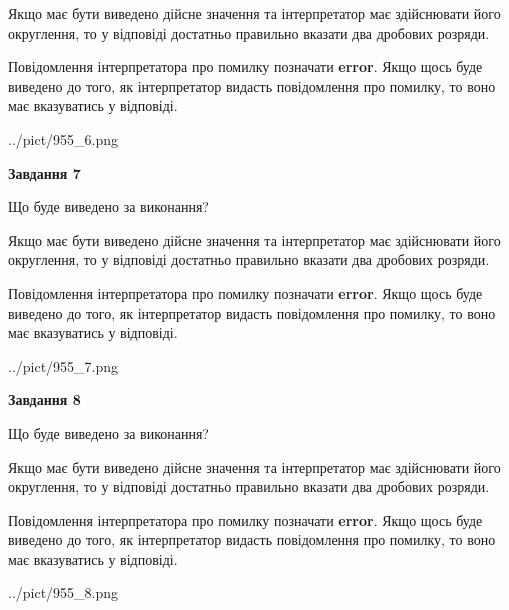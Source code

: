 \documentclass[12pt, ukrainian]{article}
\begin{document}
{\begin {Large}
Якщо має бути виведено дійсне значення та інтерпретатор має здійснювати його округлення, 
то у відповіді достатньо правильно вказати два дробових розряди.

Повідомлення інтерпретатора про помилку позначати \textbf{error}.
Якщо щось буде виведено до того, як інтерпретатор видасть повідомлення про помилку, 
то воно має вказуватись у відповіді. \par

\begin{center}
	{../pict/955_6.png}
\end{center}
\newpage

{\begin {center}\textbf{Завдання 7}\end {center}}\par
Що буде виведено за виконання? \par

Якщо має бути виведено дійсне значення та інтерпретатор має здійснювати його округлення, 
то у відповіді достатньо правильно вказати два дробових розряди.

Повідомлення інтерпретатора про помилку позначати \textbf{error}.
Якщо щось буде виведено до того, як інтерпретатор видасть повідомлення про помилку, 
то воно має вказуватись у відповіді. \par

\begin{center}
	{../pict/955_7.png}
\end{center}
\newpage

{\begin {center}\textbf{Завдання 8}\end {center}}\par
Що буде виведено за виконання? \par

Якщо має бути виведено дійсне значення та інтерпретатор має здійснювати його округлення, 
то у відповіді достатньо правильно вказати два дробових розряди.

Повідомлення інтерпретатора про помилку позначати \textbf{error}.
Якщо щось буде виведено до того, як інтерпретатор видасть повідомлення про помилку, 
то воно має вказуватись у відповіді. \par

\begin{center}
	{../pict/955_8.png}
\end{center}
\newpage


\end{Large}}
\end{document}
